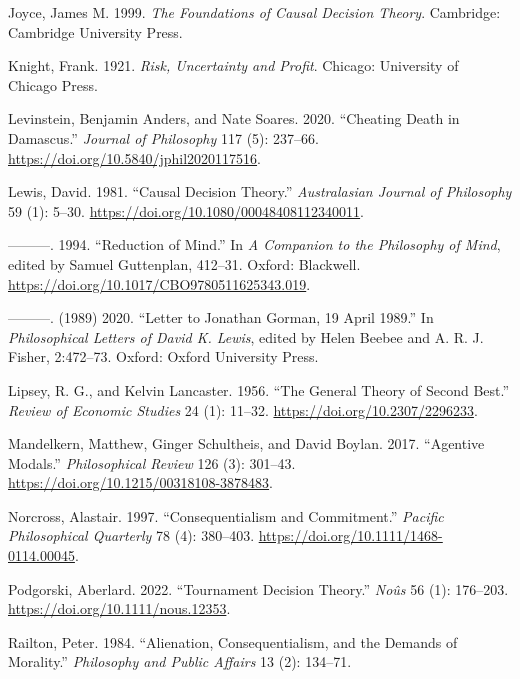 \documentclass[
  12pt,
  letterpaper,
  DIV=11,
  numbers=noendperiod,
  twoside]{scrartcl}
\newlength{\cslhangindent}
\newenvironment{CSLReferences}[2] %
 {\begin{list}{}{%
  \setlength{\itemindent}{0pt}
  \setlength{\leftmargin}{0pt}
  \setlength{\parsep}{0pt}
  \ifodd #1
   \setlength{\leftmargin}{\cslhangindent}
   \setlength{\itemindent}{-1\cslhangindent}
  \fi
  \setlength{\itemsep}{#2\baselineskip}}}
 {\end{list}}
\begin{document}
\begin{CSLReferences}{1}{0}
Joyce, James M. 1999. \emph{The Foundations of Causal Decision Theory}.
Cambridge: Cambridge University Press.

Knight, Frank. 1921. \emph{Risk, Uncertainty and Profit}. Chicago:
University of Chicago Press.

Levinstein, Benjamin Anders, and Nate Soares. 2020. {``Cheating Death in
Damascus.''} \emph{Journal of Philosophy} 117 (5): 237--66.
\url{https://doi.org/10.5840/jphil2020117516}.

Lewis, David. 1981. {``Causal Decision Theory.''} \emph{Australasian
Journal of Philosophy} 59 (1): 5--30.
\url{https://doi.org/10.1080/00048408112340011}.

---------. 1994. {``Reduction of Mind.''} In \emph{A Companion to the
Philosophy of Mind}, edited by Samuel Guttenplan, 412--31. Oxford:
Blackwell. \url{https://doi.org/10.1017/CBO9780511625343.019}.

---------. (1989) 2020. {``Letter to Jonathan Gorman, 19 April 1989.''}
In \emph{Philosophical Letters of David {K}. Lewis}, edited by Helen
Beebee and A. R. J. Fisher, 2:472--73. Oxford: Oxford University Press.

Lipsey, R. G., and Kelvin Lancaster. 1956. {``The General Theory of
Second Best.''} \emph{Review of Economic Studies} 24 (1): 11--32.
\url{https://doi.org/10.2307/2296233}.

Mandelkern, Matthew, Ginger Schultheis, and David Boylan. 2017.
{``Agentive Modals.''} \emph{Philosophical Review} 126 (3): 301--43.
\url{https://doi.org/10.1215/00318108-3878483}.

Norcross, Alastair. 1997. {``Consequentialism and Commitment.''}
\emph{Pacific Philosophical Quarterly} 78 (4): 380--403.
\url{https://doi.org/10.1111/1468-0114.00045}.

Podgorski, Aberlard. 2022. {``Tournament Decision Theory.''}
\emph{No{û}s} 56 (1): 176--203.
\url{https://doi.org/10.1111/nous.12353}.

Railton, Peter. 1984. {``Alienation, Consequentialism, and the Demands
of Morality.''} \emph{Philosophy and Public Affairs} 13 (2): 134--71.


\end{CSLReferences}
\end{document}
